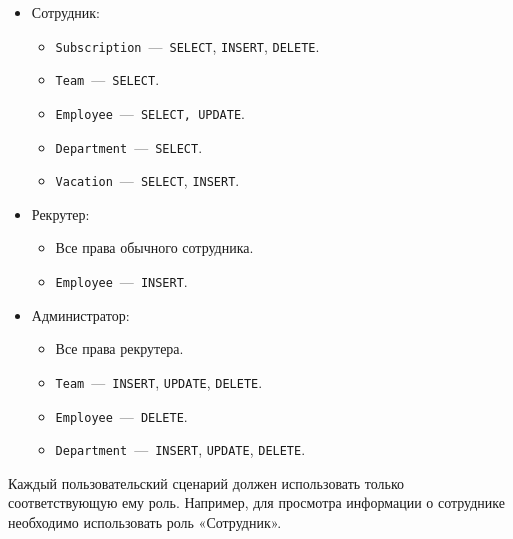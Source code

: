 \begin{itemize}
	\item Сотрудник:
	\begin{itemize}
		\item \texttt{Subscription}~---~\texttt{SELECT}, \texttt{INSERT}, \texttt{DELETE}.
		\item \texttt{Team}~---~\texttt{SELECT}.
		\item \texttt{Employee}~---~\texttt{SELECT, UPDATE}.
		\item \texttt{Department}~---~\texttt{SELECT}.
		\item \texttt{Vacation}~---~\texttt{SELECT}, \texttt{INSERT}.
	\end{itemize}
	
	\item Рекрутер:
	\begin{itemize}
		\item Все права обычного сотрудника.
		\item \texttt{Employee}~---~\texttt{INSERT}.
	\end{itemize}
	
	\item Администратор:
	\begin{itemize}
	    \item Все права рекрутера.
		\item \texttt{Team}~---~\texttt{INSERT}, \texttt{UPDATE}, \texttt{DELETE}.
		\item \texttt{Employee}~---~\texttt{DELETE}.
		\item \texttt{Department}~---~\texttt{INSERT}, \texttt{UPDATE}, \texttt{DELETE}.
	\end{itemize}
\end{itemize}

Каждый пользовательский сценарий должен использовать только соответствующую ему роль. Например, для просмотра информации о сотруднике необходимо использовать роль «Сотрудник».


